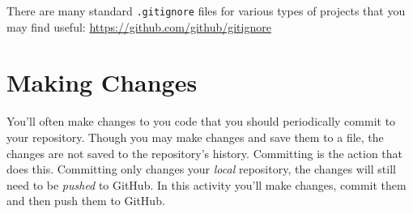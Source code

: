 \documentclass[12pt]{scrartcl}
\begin{document}
There are many standard \texttt{.gitignore} files for
various types of projects that you may find useful: 
\url{https://github.com/github/gitignore}

\section{Making Changes}

You'll often make changes to you code that you should periodically
commit to your repository.  Though you may make changes and save them to a file, 
the changes are not saved to the repository's history.  Committing is 
the action that does this.  Committing only changes your \emph{local}
repository, the changes will still need to be \emph{pushed} to GitHub.
In this activity you'll make changes, commit them and then push them
to GitHub.
\end{document}
